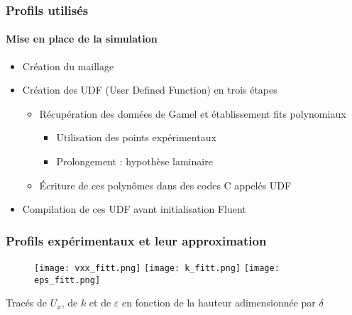 \documentclass[12pt, xcolor=svgnames]{beamer}
\newcommand{\bwarrow}{\item[\color{DarkRed} \ding{227}]}
\newcommand{\warrow}{\item[\color{blue!50!black!70} \tiny{\ding{109}}]}
\newcommand{\sarrow}{\item[\color{blue!50!black!70!orange!60} \tiny{\ding{55}}]}
\begin{document}
\begin{frame}
\frametitle{Profils utilisés}
\framesubtitle{Mise en place de la simulation}

\begin{itemize}
	\bwarrow Création du maillage 	 \\[5mm]
	\bwarrow Création des UDF (User Defined Function) en trois étapes
	\begin{itemize}
		\warrow Récupération des données de Gamel et établissement fits polynomiaux \\
			\begin{itemize}
				\sarrow Utilisation des points expérimentaux 
				\sarrow Prolongement : hypothèse laminaire 
			\end{itemize}
		\warrow Écriture de ces polynômes dans des codes C appelés UDF \\[5mm]
	\end{itemize}
	\bwarrow Compilation de ces UDF avant initialisation Fluent
\end{itemize}

\end{frame}
 	
\begin{frame}
\frametitle{Profils expérimentaux et leur approximation}
	\begin{figure}[!ht]
		\centering
		\texttt{[image: vxx\_fitt.png]} \hfill
		\texttt{[image: k\_fitt.png]}	   \hfill	
		\texttt{[image: eps\_fitt.png]} 
	\end{figure}
	  \small{Tracés de $U_x$, de $k$ et de $\varepsilon$ en fonction de la hauteur adimensionnée par $\delta$}
\end{frame} 	
 	
\end{document}
